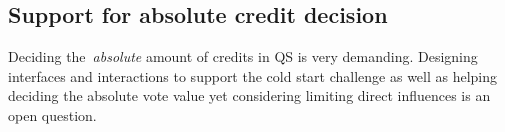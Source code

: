 \subsection{Support for absolute credit decision}
Deciding the~\textit{absolute} amount of credits in QS is very demanding. Designing interfaces and interactions to support the cold start challenge as well as helping deciding the absolute vote value yet considering limiting direct influences is an open question.









